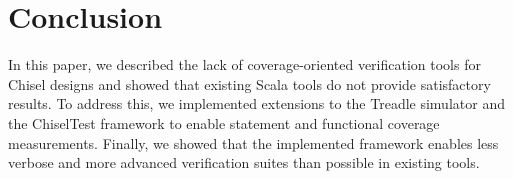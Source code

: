 \documentclass[conference]{IEEEtran}
\newcommand{\andrew}[1]{{\color{red} Andrew: #1}}
\newcommand{\hjd}[1]{{\color{pink} Hans: #1}}
\begin{document}

\section{Conclusion}

In this paper, we described the lack of coverage-oriented verification tools 
for Chisel designs and showed that existing Scala tools do not provide satisfactory results. To 
address this, we implemented extensions to the Treadle simulator and the ChiselTest framework 
to enable statement and functional coverage measurements. Finally, we showed that the implemented 
framework enables less verbose and more advanced verification suites than possible in existing tools.
\end{document}
